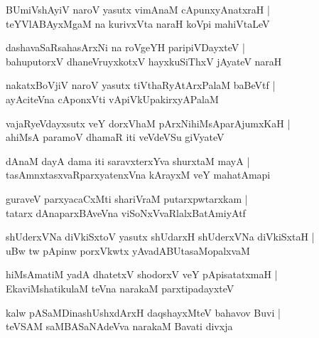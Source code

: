 \documentclass[twoside,12pt,openright]{book}
\newcounter{shloka}[chapter]
\begin{document}
\begin{shloka}%
BUmiVshAyiV naroV yasutx vimAnaM cApunxyAnatxraH |\\
teYVlABAyxMgaM na kurivxVta naraH koVpi mahiVtaLeV 
\end{shloka}

\begin{shloka}%
dashavaSaRsahasArxNi na roVgeYH paripiVDayxteV |\\
bahuputorxV dhaneVruyxkotxV hayxkuSiThxV jAyateV naraH 
\end{shloka}

\begin{shloka}%
nakatxBoVjiV naroV yasutx tiVthaRyAtArxPalaM baBeVtf |\\
ayAciteVna cAponxVti vApiVkUpakirxyAPalaM 
\end{shloka}

\begin{shloka}%
vajaRyeVdayxsutx veY dorxVhaM pArxNihiMsAparAjumxKaH |\\
ahiMsA paramoV dhamaR iti veVdeVSu giVyateV 
\end{shloka}

\begin{shloka}%
dAnaM dayA dama iti saravxterxYva shurxtaM mayA |\\
tasAmnxtasxvaRparxyatenxVna kArayxM veY mahatAmapi
\end{shloka}

\begin{shloka}%
guraveV parxyacaCxMti shariVraM putarxpwtarxkam |\\
tatarx dAnaparxBAveVna viSoNxVvaRlalxBatAmiyAtf 
\end{shloka}

\begin{shloka}%
shUderxVNa diVkiSxtoV yasutx shUdarxH shUderxVNa diVkiSxtaH |\\
uBw tw pApinw porxVkwtx yAvadABUtasaMopalxvaM 
\end{shloka}

\begin{shloka}%
hiMsAmatiM yadA dhatetxV shodorxV veY pApisatatxmaH |\\
EkaviMshatikulaM teVna narakaM parxtipadayxteV 
\end{shloka}

\begin{shloka}%
kalw pASaMDinashUshxdArxH daqshayxMteV bahavov Buvi |\\
teVSAM saMBASaNAdeVva narakaM Bavati divxja 
\end{shloka}
\end{document}
